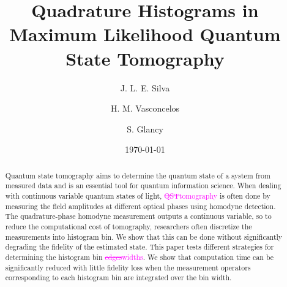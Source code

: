 \documentclass[
reprint,
superscriptaddress,
showpacs,
amsmath,
amssymb,
aps,
pra,
longbibliography
]{revtex4-1}
\providecommand{\aucmnt}[1]{#1}
\providecommand{\editcolor}[2]{\textcolor{#1}{#2}}
\providecommand{\aucmnt}[1]{}
\providecommand{\editcolor}[2]{#2}
\newcommand{\SG}[1]{\editcolor{magenta}{#1}}
\newcommand{\SGs}[1]{\aucmnt{\editcolor{magenta}{\sout{#1}}}}
\begin{document}

\title{Quadrature Histograms in Maximum Likelihood Quantum State Tomography}%
\author{J. L. E. Silva}
\author{H. M. Vasconcelos}
\author{S. Glancy}


\date{\today}%

\begin{abstract}
  Quantum state tomography aims to determine the quantum state of a
  system from measured data and is an essential tool for quantum
  information science.  When dealing with continuous variable quantum
  states of light, \SGs{QST}\SG{tomography} is often done by measuring
  the field amplitudes at different optical phases using homodyne
  detection.  The quadrature-phase homodyne measurement outputs a
  continuous variable, so to reduce the computational cost of
  tomography, researchers often discretize the measurements into
  histogram bin.  We show that this can be done without significantly
  degrading the fidelity of the estimated state.  This paper tests
  different strategies for determining the histogram bin
  \SGs{edges}\SG{widths}.  We show that computation time can be
  significantly reduced with little fidelity loss when the measurement
  operators corresponding to each histogram bin are integrated over
  the bin width.
\end{abstract}

\maketitle
\end{document}
